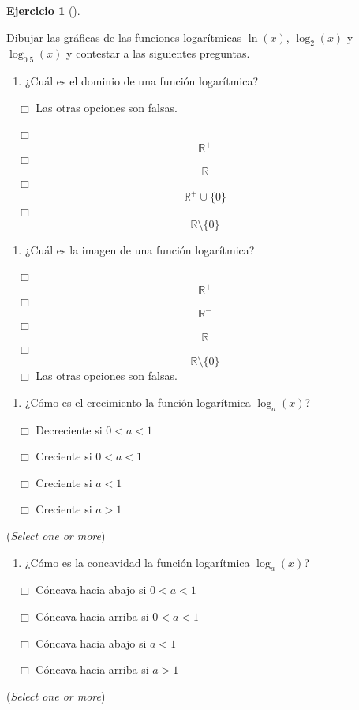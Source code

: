 \documentclass[
  a4paper,
]{scrreport}
\providecommand{\tightlist}{%
  \setlength{\itemsep}{0pt}\setlength{\parskip}{0pt}}\usepackage{longtable,booktabs,array}
\theoremstyle{definition}
\newtheorem{exercise}{Ejercicio}[chapter]
\theoremstyle{remark}
\begin{document}
\leavevmode{}%
\begin{exercise}[]\label{exr-funciones-logaritmicas}

Dibujar las gráficas de las funciones logarítmicas \(\ln(x)\),
\(\log_2(x)\) y \(\log_{0.5}(x)\) y contestar a las siguientes
preguntas.

\begin{enumerate}
\def\labelenumi{\alph{enumi}.}
\tightlist
\item
  ¿Cuál es el dominio de una función logarítmica?
\end{enumerate}

${\quad\Box}$ Las otras opciones son falsas.

${\quad\Box}$ $$\mathbb{R}^+$$
${\quad\Box}$ $$\mathbb{R}$$
${\quad\Box}$ $$\mathbb{R}^+\cup \{0\}$$
${\quad\Box}$ $$\mathbb{R}\setminus\{0\}$$

\begin{enumerate}
\def\labelenumi{\alph{enumi}.}
\setcounter{enumi}{1}
\tightlist
\item
  ¿Cuál es la imagen de una función logarítmica?
\end{enumerate}

${\quad\Box}$ $$\mathbb{R}^+$$
${\quad\Box}$ $$\mathbb{R}^-$$
${\quad\Box}$ $$\mathbb{R}$$
${\quad\Box}$ $$\mathbb{R}\setminus\{0\}$$
${\quad\Box}$ Las otras opciones son falsas.

\begin{enumerate}
\def\labelenumi{\alph{enumi}.}
\setcounter{enumi}{2}
\tightlist
\item
  ¿Cómo es el crecimiento la función logarítmica \(\log_a(x)\)?
\end{enumerate}

${\quad\Box}$ Decreciente si $0 < a <1$

${\quad\Box}$ Creciente si $0 < a < 1$

${\quad\Box}$ Creciente si $a<1$

${\quad\Box}$ Creciente si $a>1$

(\emph{Select one or more})

\begin{enumerate}
\def\labelenumi{\alph{enumi}.}
\setcounter{enumi}{3}
\tightlist
\item
  ¿Cómo es la concavidad la función logarítmica \(\log_a(x)\)?
\end{enumerate}

${\quad\Box}$ Cóncava hacia abajo si $0 < a < 1$

${\quad\Box}$ Cóncava hacia arriba si $0 < a < 1$

${\quad\Box}$ Cóncava hacia abajo si $a<1$

${\quad\Box}$ Cóncava hacia arriba si $a>1$

(\emph{Select one or more})

\end{exercise}
\end{document}
